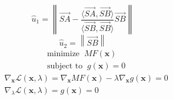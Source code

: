 \documentclass{article}
\begin{document}
\setlength{\belowdisplayshortskip}{5pt}
\setlength{\abovedisplayshortskip}{5pt}
\begin{equation} \label{eq:u1}
\hat{u}_{1} =  \left\| \overrightarrow{SA}-{\frac{\langle \overrightarrow{SA},\overrightarrow{SB}\rangle}{\langle \overrightarrow{SB},\overrightarrow{SB}\rangle}}\overrightarrow{SB} \right\| 
\end{equation}
\setlength{\belowdisplayshortskip}{10pt}
\begin{equation} \label{eq:u2}
\hat{u}_{2} = \left\| \overrightarrow{SB} \right\|
\end{equation}
\setlength{\belowdisplayshortskip}{5pt}
\setlength{\abovedisplayshortskip}{5pt}
\begin{equation} \label{eq: MFminCon}
\begin{split}
& \text{minimize}\;\; MF(\textbf{x}) \\
& \text{subject to}\;\; g(\textbf{x}) = 0
\end{split}
\end{equation}
\setlength{\belowdisplayshortskip}{5pt}
\setlength{\abovedisplayshortskip}{5pt}
\begin{subequations} 
\begin{align}
& \nabla_\textbf{x}\mathcal{L}(\textbf{x},\lambda)=\nabla_\textbf{x}MF(\textbf{x})-\lambda\nabla_\textbf{x}g(\textbf{x})=0 \label{eq: LagCondition1} \\
& \nabla_\lambda\mathcal{L}(\textbf{x},\lambda)=g(\textbf{x})=0 \label{eq:LagCondition2}
\end{align}
\end{subequations}
\end{document}
